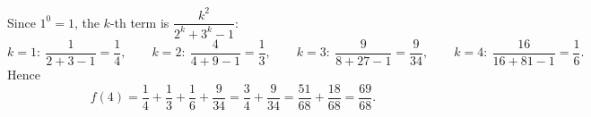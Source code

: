 Since $1^0=1$, the $k$-th term is $\dfrac{k^2}{2^k+3^k-1}$:
\[
k=1:\ \dfrac{1}{2+3-1}=\dfrac{1}{4},\qquad k=2:\ \dfrac{4}{4+9-1}=\dfrac{1}{3},\qquad k=3:\ \dfrac{9}{8+27-1}=\dfrac{9}{34},\qquad k=4:\ \dfrac{16}{16+81-1}=\dfrac{1}{6} .
\]
Hence
\[
f(4)=\dfrac{1}{4}+\dfrac{1}{3}+\dfrac{1}{6}+\dfrac{9}{34}=\dfrac{3}{4}+\dfrac{9}{34}=\dfrac{51}{68}+\dfrac{18}{68}=\boxed{\dfrac{69}{68}}.
\]
